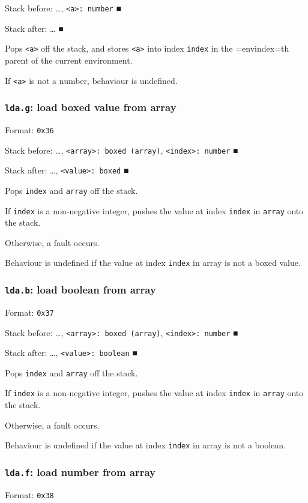 \documentclass[11pt]{article}
\begin{document}
Stack before: \ldots{}​, \texttt{<a>: number} ■

Stack after: \ldots{}​ ■

Pops \texttt{<a>} off the stack, and stores \texttt{<a>} into index \texttt{index} in the
=envindex=th parent of the current environment.

If \texttt{<a>} is not a number, behaviour is undefined.

\subsubsection{\texttt{lda.g}: load boxed value from array}
\label{sec:org0b3a1ff}
Format: \texttt{0x36}

Stack before: \ldots{}​, \texttt{<array>: boxed (array)}, \texttt{<index>: number} ■

Stack after: \ldots{}​, \texttt{<value>: boxed} ■

Pops \texttt{index} and \texttt{array} off the stack.

If \texttt{index} is a non-negative integer, pushes the value at index \texttt{index}
in \texttt{array} onto the stack.

Otherwise, a fault occurs.

Behaviour is undefined if the value at index \texttt{index} in array is not a
boxed value.

\subsubsection{\texttt{lda.b}: load boolean from array}
\label{sec:orgb1de169}
Format: \texttt{0x37}

Stack before: \ldots{}​, \texttt{<array>: boxed (array)}, \texttt{<index>: number} ■

Stack after: \ldots{}​, \texttt{<value>: boolean} ■

Pops \texttt{index} and \texttt{array} off the stack.

If \texttt{index} is a non-negative integer, pushes the value at index \texttt{index}
in \texttt{array} onto the stack.

Otherwise, a fault occurs.

Behaviour is undefined if the value at index \texttt{index} in array is not a
boolean.

\subsubsection{\texttt{lda.f}: load number from array}
\label{sec:orgdc8e9a7}
Format: \texttt{0x38}
\end{document}
